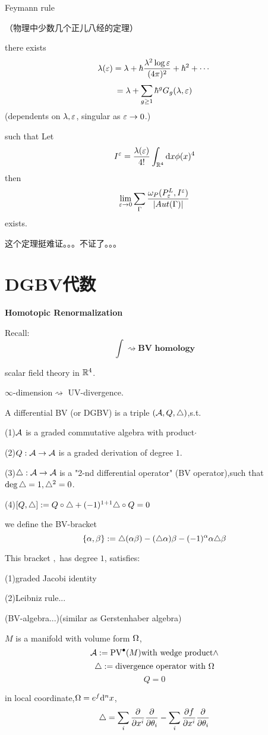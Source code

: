 Feymann rule

\begin{thm}[Physics]（物理中少数几个正儿八经的定理）

there exists
$$\lambda(\varepsilon)=\lambda+\hbar\frac{\lambda^2\log\varepsilon}{(4\pi)^2}+\hbar^2+\cdots$$
$$=\lambda+\sum_{g\geq 1}\hbar^gG_g(\lambda,\varepsilon)$$
(dependents on $\lambda,\varepsilon$, singular as $\varepsilon\to 0$.)

such that Let
$$I^{\varepsilon}=\frac{\lambda(\varepsilon)}{4!}\int_{\mathbb{R}^4}\mathrm{d} x\phi(x)^4$$
then
$$
  \lim_{\varepsilon\to 0}\sum_{\Gamma}
  \frac{\omega_P(P_\varepsilon^L,I^\varepsilon)}
       {|Aut(\Gamma)|}
$$
exists.
\end{thm}

这个定理挺难证。。。不证了。。。

\section{DGBV代数}
\textbf{Homotopic Renormalization}

Recall:
$$\int\rightsquigarrow\textbf{BV homology}$$

scalar field theory in $\mathbb{R}^4$.

$\infty$-dimension$\rightsquigarrow$ UV-divergence.

\begin{definition}
A differential BV (or DGBV) is a triple $(\mathcal{A},Q,\triangle)$,s.t.

(1)$\mathcal{A}$ is a graded commutative algebra with product$\cdot$

(2)$Q:\mathcal{A}\to\mathcal{A}$ is a graded derivation of degree $1$.

(3)$\triangle:\mathcal{A}\to\mathcal{A}$ is a "2-nd differential operator" (BV operator),such that
$\deg\triangle=1,\triangle^2=0$.

(4)$[Q,\triangle]:=Q\circ\triangle+(-1)^{1+1}\triangle\circ Q=0$
\end{definition}
we define the BV-bracket
$$\{\alpha,\beta\}:=\triangle(\alpha\beta)-(\triangle\alpha)\beta-(-1)^\alpha\alpha\triangle\beta$$

This bracket ${,}$ has degree $1$, satisfies:

(1)graded Jacobi identity

(2)Leibniz rule...

(BV-algebra...)(similar as Gerstenhaber algebra)

\begin{example}
$M$ is a manifold with volume form $\Omega$,
$$\mathcal{A}:=\operatorname{PV}^{\bullet}(M)\text{with wedge product}\wedge$$
$$\triangle:=\text{divergence operator with $\Omega$}$$
$$Q=0$$

in local coordinate,$\Omega=e^f\mathrm{d}^nx$,
$$\triangle=\sum_i\frac{\partial } {\partial x^i}\frac{\partial } {\partial \theta_i}-\sum_i\frac{\partial f} {\partial x^i}\frac{\partial } {\partial \theta_i}$$
\end{example}

